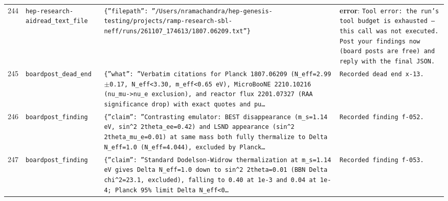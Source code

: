 \documentclass[11pt,a4paper]{article}
\begin{document}
\begin{longtable}{@{}p{}p{}p{}p{}@{}}
244 & \texttt{hep-research-aid}\newline\texttt{read\_\allowbreak{}text\_\allowbreak{}file} & \texttt{\{''filepath'':\allowbreak{} ''/\allowbreak{}Users/\allowbreak{}nramachandra/\allowbreak{}hep-genesis-testing/\allowbreak{}projects/\allowbreak{}ramp-research-sbl-neff/\allowbreak{}runs/\allowbreak{}261107\_\allowbreak{}174613/\allowbreak{}1807.06209.txt''\}\allowbreak{}} & \textbf{error}: \texttt{Tool error:\allowbreak{} the run's tool budget is exhausted --- this call was not executed. Post your findings now (board posts are free)\allowbreak{} and reply with the final JSON.} \\
245 & \texttt{board}\newline\texttt{post\_\allowbreak{}dead\_\allowbreak{}end} & \texttt{\{''what'':\allowbreak{} ''Verbatim citations for Planck 1807.06209 (N\_\allowbreak{}eff=\allowbreak{}2.99$\pm$0.17,\allowbreak{} N\_\allowbreak{}eff\textless{}\allowbreak{}3.30,\allowbreak{} m\_\allowbreak{}eff\textless{}\allowbreak{}0.65 eV)\allowbreak{},\allowbreak{} MicroBooNE 2210.10216 (nu\_\allowbreak{}mu-\textgreater{}\allowbreak{}nu\_\allowbreak{}e exclusion)\allowbreak{},\allowbreak{} and reactor flux 2201.07327 (RAA significance drop)\allowbreak{} with exact quotes and pu\ldots{}\allowbreak{}} & \texttt{Recorded dead end x-13.} \\
246 & \texttt{board}\newline\texttt{post\_\allowbreak{}finding} & \texttt{\{''claim'':\allowbreak{} ''Contrasting emulator:\allowbreak{} BEST disappearance (m\_\allowbreak{}s=\allowbreak{}1.14 eV,\allowbreak{} sin\textasciicircum{}\allowbreak{}2 2theta\_\allowbreak{}ee=\allowbreak{}0.42)\allowbreak{} and LSND appearance (sin\textasciicircum{}\allowbreak{}2 2theta\_\allowbreak{}mu\_\allowbreak{}e=\allowbreak{}0.01)\allowbreak{} at same mass both fully thermalize to Delta N\_\allowbreak{}eff=\allowbreak{}1.0 (N\_\allowbreak{}eff=\allowbreak{}4.044)\allowbreak{},\allowbreak{} excluded by Planck\ldots{}\allowbreak{}} & \texttt{Recorded finding f-052.} \\
247 & \texttt{board}\newline\texttt{post\_\allowbreak{}finding} & \texttt{\{''claim'':\allowbreak{} ''Standard Dodelson-Widrow thermalization at m\_\allowbreak{}s=\allowbreak{}1.14 eV gives Delta N\_\allowbreak{}eff=\allowbreak{}1.0 down to sin\textasciicircum{}\allowbreak{}2 2theta=\allowbreak{}0.01 (BBN Delta chi\textasciicircum{}\allowbreak{}2=\allowbreak{}23.1,\allowbreak{} excluded)\allowbreak{},\allowbreak{} falling to 0.40 at 1e-3 and 0.04 at 1e-4;\allowbreak{} Planck 95\% limit Delta N\_\allowbreak{}eff\textless{}\allowbreak{}0\ldots{}\allowbreak{}} & \texttt{Recorded finding f-053.} \\

\end{longtable}
\end{document}
